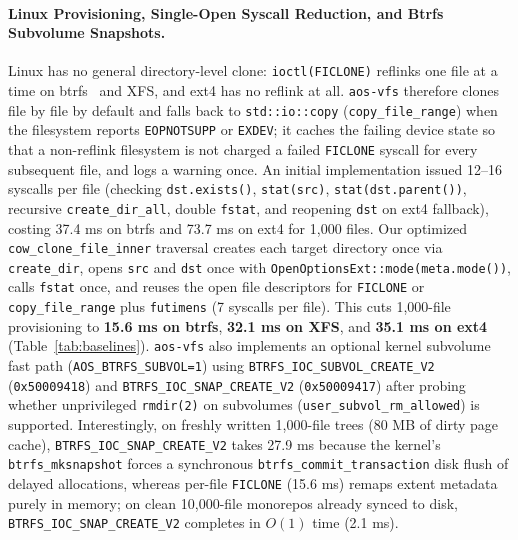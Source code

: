 \documentclass[10pt,twocolumn]{article}
\begin{document}
\paragraph{Linux Provisioning, Single-Open Syscall Reduction, and Btrfs Subvolume Snapshots.} Linux has no general directory-level clone: \texttt{ioctl(FICLONE)} reflinks one file at a time on btrfs~\cite{rodeh2013btrfs} and XFS, and ext4 has no reflink at all. \texttt{aos-vfs} therefore clones file by file by default and falls back to \texttt{std::io::copy} (\texttt{copy\_file\_range}) when the filesystem reports \texttt{EOPNOTSUPP} or \texttt{EXDEV}; it caches the failing device state so that a non-reflink filesystem is not charged a failed \texttt{FICLONE} syscall for every subsequent file, and logs a warning once. An initial implementation issued 12--16 syscalls per file (checking \texttt{dst.exists()}, \texttt{stat(src)}, \texttt{stat(dst.parent())}, recursive \texttt{create\_dir\_all}, double \texttt{fstat}, and reopening \texttt{dst} on ext4 fallback), costing 37.4 ms on btrfs and 73.7 ms on ext4 for 1,000 files. Our optimized \texttt{cow\_clone\_file\_inner} traversal creates each target directory once via \texttt{create\_dir}, opens \texttt{src} and \texttt{dst} once with \texttt{OpenOptionsExt::mode(meta.mode())}, calls \texttt{fstat} once, and reuses the open file descriptors for \texttt{FICLONE} or \texttt{copy\_file\_range} plus \texttt{futimens} (7 syscalls per file). This cuts 1,000-file provisioning to \textbf{15.6 ms on btrfs}, \textbf{32.1 ms on XFS}, and \textbf{35.1 ms on ext4} (Table~\ref{tab:baselines}). \texttt{aos-vfs} also implements an optional kernel subvolume fast path (\texttt{AOS\_BTRFS\_SUBVOL=1}) using \texttt{BTRFS\_IOC\_SUBVOL\_CREATE\_V2} (\texttt{0x50009418}) and \texttt{BTRFS\_IOC\_SNAP\_CREATE\_V2} (\texttt{0x50009417}) after probing whether unprivileged \texttt{rmdir(2)} on subvolumes (\texttt{user\_subvol\_rm\_allowed}) is supported. Interestingly, on freshly written 1,000-file trees (80 MB of dirty page cache), \texttt{BTRFS\_IOC\_SNAP\_CREATE\_V2} takes 27.9 ms because the kernel's \texttt{btrfs\_mksnapshot} forces a synchronous \texttt{btrfs\_commit\_transaction} disk flush of delayed allocations, whereas per-file \texttt{FICLONE} (15.6 ms) remaps extent metadata purely in memory; on clean 10,000-file monorepos already synced to disk, \texttt{BTRFS\_IOC\_SNAP\_CREATE\_V2} completes in $O(1)$ time (2.1 ms).
\end{document}
